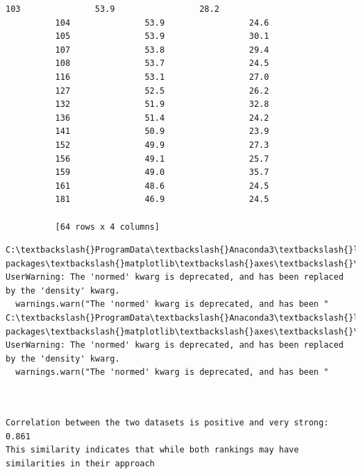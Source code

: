 \documentclass[11pt]{article}
\begin{document}
\begin{Verbatim}[commandchars=\\\{\}]
          103               53.9                 28.2  
          104               53.9                 24.6  
          105               53.9                 30.1  
          107               53.8                 29.4  
          108               53.7                 24.5  
          116               53.1                 27.0  
          127               52.5                 26.2  
          132               51.9                 32.8  
          136               51.4                 24.2  
          141               50.9                 23.9  
          152               49.9                 27.3  
          156               49.1                 25.7  
          159               49.0                 35.7  
          161               48.6                 24.5  
          181               46.9                 24.5  
          
          [64 rows x 4 columns]
\end{Verbatim}
            
    \begin{Verbatim}[commandchars=\\\{\}]
C:\textbackslash{}ProgramData\textbackslash{}Anaconda3\textbackslash{}lib\textbackslash{}site-packages\textbackslash{}matplotlib\textbackslash{}axes\textbackslash{}\_axes.py:6462: UserWarning: The 'normed' kwarg is deprecated, and has been replaced by the 'density' kwarg.
  warnings.warn("The 'normed' kwarg is deprecated, and has been "
C:\textbackslash{}ProgramData\textbackslash{}Anaconda3\textbackslash{}lib\textbackslash{}site-packages\textbackslash{}matplotlib\textbackslash{}axes\textbackslash{}\_axes.py:6462: UserWarning: The 'normed' kwarg is deprecated, and has been replaced by the 'density' kwarg.
  warnings.warn("The 'normed' kwarg is deprecated, and has been "

    \end{Verbatim}

    \begin{Verbatim}[commandchars=\\\{\}]


Correlation between the two datasets is positive and very strong: 0.861
This similarity indicates that while both rankings may have similarities in their approach



    \end{Verbatim}

    \begin{center}
    \end{center}
    { \hspace*{\fill} \\}
    

    
    
    
    
\end{document}

